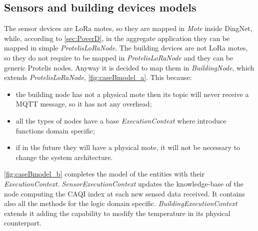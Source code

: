 \subsection*{Sensors and building devices models}
The sensor devices are LoRa motes, so they are mapped in \mbox{\textit{Mote}} inside DingNet, while, according to \cref{sec:PoverD}, in the aggregate application they can be mapped in simple \mbox{\textit{ProtelisLoRaNode}}.
The building devices are not LoRa motes, so they do not require to be mapped in \mbox{\textit{ProtelisLoRaNode}} and they can be generic Protelis nodes.
Anyway it is decided to map them in \mbox{\textit{BuildingNode}}, which extends \mbox{\textit{ProtelisLoRaNode}}, \autoref{fig:caseBmodel_a}. This because:
\begin{itemize}
    \item the building node has not a physical mote then its topic will never receive a MQTT message, so it has not any overhead;
    \item all the types of nodes have a base \mbox{\textit{ExecutionContext}} where introduce functions domain specific;
    \item if in the future they will have a physical mote, it will not be necessary to change the system architecture.
\end{itemize}
\autoref{fig:caseBmodel_b} completes the model of the entities with their \mbox{\textit{ExecutionContext}}.
\mbox{\textit{SensorExecutionContext}} updates the knowledge-base of the node computing the CAQI index at each new sensed data received. It contains also all the methods for the logic domain specific. \mbox{\textit{BuildingExecutionContext}} extends it adding the capability to modify the temperature in its physical counterpart.
